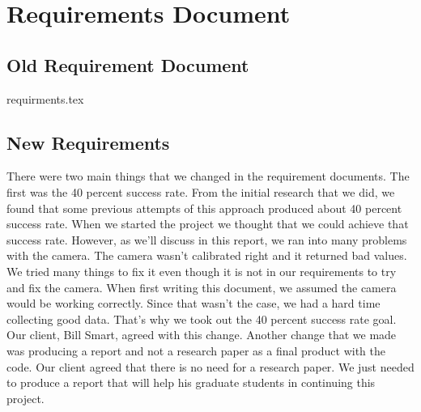 \documentclass[onecolumn, draftclsnofoot,10pt, compsoc]{IEEEtran}
\begin{document}
	\section{Requirements Document}
	\subsection{Old Requirement Document}
	{requirments.tex}
	\subsection{New Requirements}
	There were two main things that we changed in the requirement documents. The first was the 40 percent success rate. From the initial research that we did, we found that some previous attempts of this approach produced about 40 percent success rate. When we started the project we thought that we could achieve that success rate. However, as we'll discuss in this report, we ran into many problems with the camera. The camera wasn't calibrated right and it returned bad values. We tried many things to fix it even though it is not in our requirements to try and fix the camera. When first writing this document, we assumed the camera would be working correctly. Since that wasn't the case, we had a hard time collecting good data. That's why we took out the 40 percent  success rate goal. Our client, Bill Smart, agreed with this change. Another change that we made was producing a report and not a research paper as a final product with the code. Our client agreed that there is no need for a research paper. We just needed to produce a report that will help his graduate students in continuing this project. 
\end{document}

